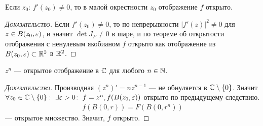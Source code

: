 \documentclass[../../main.tex]{subfiles}
\begin{document}
\begin{crly}
 Если $ z_0 $: $ f'(z_0) \neq 0 $, то в малой окрестности $ z_0 $ отображение $ f $ открыто.
\end{crly}
\begin{proof}[\normalfont\textsc{Доказательство}]
 Если $ f'(z_0) \neq 0 $, то по непрерывности $ \left| f'(z) \right|^{2} \neq 0 $ для $ z \in B(z_0, \varepsilon) $, и значит $ \det J_F \neq 0 $ в шаре, и по теореме об открытости отображения с ненулевым якобианом $ f $ открыто как отображение из $ B(z_0, \varepsilon) \subset \mathbb{R}^{2} $ в $ \mathbb{R}^{2} $.
\end{proof}
\begin{lm}
 $ z^{n} $ --- открытое отображение в $ \mathbb{C} $ для любого $ n \in \mathbb{N} $.
\end{lm}
\begin{proof}[\normalfont\textsc{Доказательство}]
 Производная $(z^{n})' = nz^{n-1} $  --- не обнуляется в $ \mathbb{C} \setminus \left\{ 0 \right\} $. Значит $ \forall z_0 \in \mathbb{C} \setminus \left\{ 0 \right\} \colon\; \exists  \varepsilon > 0 \colon\; f=z^{n}, f(B(z_0, \varepsilon))  $ открыто по предыдущему следствию.
 \begin{align*}
  f(B(0,r)) = F(B(0, r^{n}))
 \end{align*} --- открытое множество. Значит, $ f $ открыто.
\end{proof}
\end{document}
